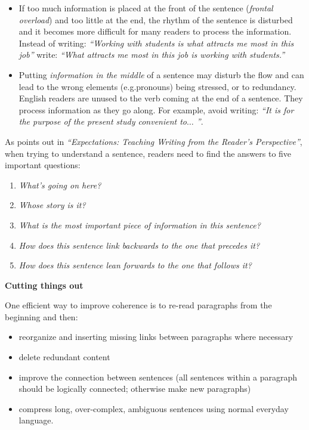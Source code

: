 \documentclass[graybox,envcountchap,sectrefs,UStrade]{svmono}
\begin{document}
\begin{itemize}
    \item If too much information is placed at the front of the sentence (\emph{frontal overload}) and too little at the end, the rhythm of the sentence is disturbed and it becomes more difficult for many readers to process the information. Instead of writing: \emph{``Working with students is what attracts me most in this job''} write: \emph{``What attracts me most in this job is working with students.''}
    \item Putting \emph{information in the middle} of a sentence may disturb the flow and can lead to the wrong elements (e.g.\@ pronouns) being stressed, or to redundancy. English readers are unused to the verb coming at the end of a sentence. They process information as they go along. For example, avoid writing: \emph{``It is for the purpose of the present study convenient to$\ldots$ ''}.
\end{itemize}

As \citet{Gopen2004} points out in \emph{``Expectations: Teaching Writing from the Reader's Perspective''}, when trying to understand a sentence, readers need to find the answers to five important questions:

\begin{enumerate}
  \item \emph{What's going on here?}
  \item \emph{Whose story is it?}
  \item \emph{What is the most important piece of information in this sentence?}
  \item \emph{How does this sentence link backwards to the one that precedes it?}
  \item \emph{How does this sentence lean forwards to the one that follows it?}
\end{enumerate}

\begin{flushleft}
\textbf{Cutting things out}
\end{flushleft}

\noindent One efficient way to improve coherence is to re-read paragraphs from the beginning and then:

\begin{itemize}
  \item reorganize and inserting missing links between paragraphs where necessary
  \item delete redundant content
  \item improve the connection between sentences (all sentences within a paragraph should be logically connected; otherwise make new paragraphs)
  \item compress long, over-complex, ambiguous sentences using normal everyday language.
\end{itemize}
\end{document}
